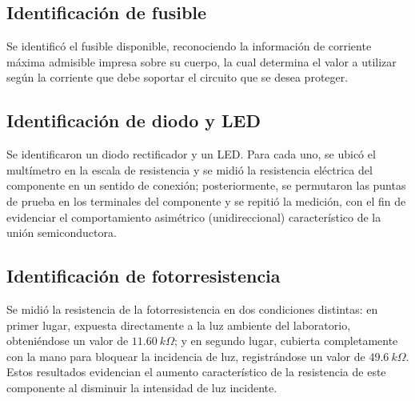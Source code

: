 \subsection{Identificación de fusible}

Se identificó el fusible disponible, reconociendo la información de corriente máxima admisible impresa sobre su cuerpo, la cual determina el valor a utilizar según la corriente que debe soportar el circuito que se desea proteger.


\subsection{Identificación de diodo y LED}

Se identificaron un diodo rectificador y un LED. Para cada uno, se ubicó el multímetro en la escala de resistencia y se midió la resistencia eléctrica del componente en un sentido de conexión; posteriormente, se permutaron las puntas de prueba en los terminales del componente y se repitió la medición, con el fin de evidenciar el comportamiento asimétrico (unidireccional) característico de la unión semiconductora.


\subsection{Identificación de fotorresistencia}

Se midió la resistencia de la fotorresistencia en dos condiciones distintas: en primer lugar, expuesta directamente a la luz ambiente del laboratorio, obteniéndose un valor de $11.60~k\Omega$; y en segundo lugar, cubierta completamente con la mano para bloquear la incidencia de luz, registrándose un valor de $49.6~k\Omega$. Estos resultados evidencian el aumento característico de la resistencia de este componente al disminuir la intensidad de luz incidente.

